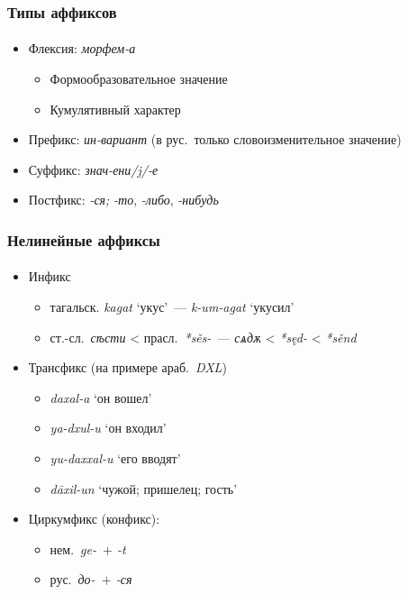 \begin{frame}
    \frametitle{Типы аффиксов}
    \framesubtitle{\autocite[14--15]{zubova_menshikova:2014}}

    \begin{itemize}
        \item Флексия: \textit{морфем-а} \begin{itemize}
            \item Формообразовательное значение
            \item Кумулятивный характер
        \end{itemize}
        \item Префикс: \textit{ин-вариант} (в рус.\ только словоизменительное значение)
        \item Суффикс: \textit{знач-ени/j/-е}
        \item Постфикс: \textit{-ся;} \textit{-то}, \textit{-либо}, \textit{-нибудь}
    \end{itemize}
\end{frame}

\begin{frame}
    \frametitle{Нелинейные аффиксы}
    \framesubtitle{\autocite[91--97]{plungyan:2003}}

    \begin{itemize}
        \item Инфикс \begin{itemize}
            \item тагальск. \textit{kagat} `укус'~--- \textit{k-um-agat} `укусил'
            \item ст.-сл.\ \textit{сѣсти} < прасл.\ \textit{*sěs-}~--- \textit{сѧдѫ} < \textit{*sęd-} < \textit{*sěnd}
        \end{itemize}
        \item<2-> Трансфикс (на примере араб.\ \textit{DXL}) \begin{itemize}
            \item \textit{daxal-a} `он вошел'
            \item \textit{ya-dxul-u} `он входил'
            \item \textit{yu-daxxal-u} `его вводят'
            \item \textit{dāxil-un} `чужой; пришелец; гость'
        \end{itemize}
        \item<3-> Циркумфикс (конфикс): \begin{itemize}
            \item нем.\ \textit{ge-~$+$ -t}
            \item рус.\ \textit{до-~$+$ -ся}
        \end{itemize}
    \end{itemize}
\end{frame}

